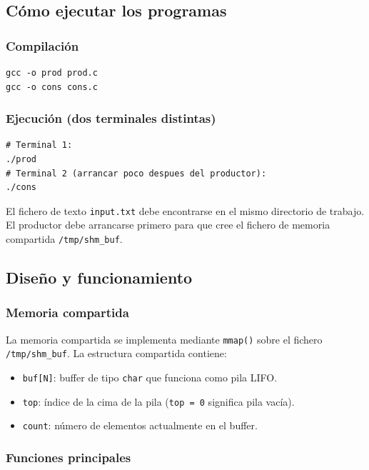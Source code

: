 \documentclass[a4paper, 12pt]{article}
\newcommand{\ic}[1]{\texttt{#1}}
\begin{document}
\subsection{Cómo ejecutar los programas}

\subsubsection*{Compilación}
\begin{lstlisting}[style=shellstyle]
gcc -o prod prod.c
gcc -o cons cons.c
\end{lstlisting}

\subsubsection*{Ejecución (dos terminales distintas)}
\begin{lstlisting}[style=shellstyle]
# Terminal 1:
./prod
# Terminal 2 (arrancar poco despues del productor):
./cons
\end{lstlisting}

El fichero de texto \ic{input.txt} debe encontrarse en el mismo directorio
de trabajo. El productor debe arrancarse primero para que cree el fichero de
memoria compartida \ic{/tmp/shm\_buf}.

\subsection{Diseño y funcionamiento}

\subsubsection*{Memoria compartida}

La memoria compartida se implementa mediante \ic{mmap()} sobre el fichero
\ic{/tmp/shm\_buf}. La estructura compartida contiene:

\begin{itemize}
  \item \ic{buf[N]}: buffer de tipo \ic{char} que funciona como pila LIFO.
  \item \ic{top}: índice de la cima de la pila (\ic{top = 0} significa pila
        vacía).
  \item \ic{count}: número de elementos actualmente en el buffer.
\end{itemize}

\subsubsection*{Funciones principales}
\end{document}
